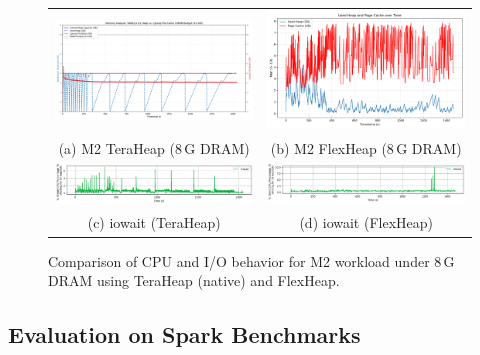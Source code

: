 \begin{figure}[htbp]
  \centering
  \begin{tabular}{cc}
    \includegraphics[width=0.48\linewidth]{fig/eval/M2_8DRAM_native.png} &
    \includegraphics[width=0.48\linewidth]{fig/eval/M2_8DRAM_flex.png} \\
    \small (a) M2 TeraHeap (8\,G DRAM) &
    \small (b) M2 FlexHeap (8\,G DRAM) \\
    \includegraphics[width=0.48\linewidth]{fig/eval/iow_cpu_native_8DRAM_M2.png} &
    \includegraphics[width=0.48\linewidth]{fig/eval/iow_cpu_flex_8DRAM_M2.png} \\
    \small (c) iowait (TeraHeap) &
    \small (d) iowait (FlexHeap) \\
  \end{tabular}
  \caption{Comparison of CPU and I/O behavior for M2 workload under 8\,G DRAM using TeraHeap (native) and FlexHeap.}
  \label{fig:m2-iow-cpu}
\end{figure}


\vspace{1em}


\subsection{Evaluation on Spark Benchmarks}

